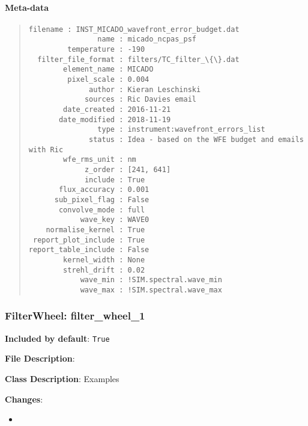 \begin{figure}[H]
\noindent{}\label{fig-micado-ncpas-psf}
\end{figure}


\paragraph{Meta-data%
  \label{id2}%
}

\begin{quote}
\begin{alltt}
\begin{lstlisting}[frame=single]
            filename : INST_MICADO_wavefront_error_budget.dat
                name : micado_ncpas_psf
         temperature : -190
  filter_file_format : filters/TC_filter_\{\}.dat
        element_name : MICADO
         pixel_scale : 0.004
              author : Kieran Leschinski
             sources : Ric Davies email
        date_created : 2016-11-21
       date_modified : 2018-11-19
                type : instrument:wavefront_errors_list
              status : Idea - based on the WFE budget and emails with Ric
        wfe_rms_unit : nm
             z_order : [241, 641]
             include : True
       flux_accuracy : 0.001
      sub_pixel_flag : False
       convolve_mode : full
            wave_key : WAVE0
    normalise_kernel : True
 report_plot_include : True
report_table_include : False
        kernel_width : None
        strehl_drift : 0.02
            wave_min : !SIM.spectral.wave_min
            wave_max : !SIM.spectral.wave_max
\end{lstlisting}
\end{alltt}
\end{quote}


\subsubsection{FilterWheel: \textquotedbl{}filter\_wheel\_1\textquotedbl{}%
  \label{filterwheel-filter-wheel-1}%
}

\textbf{Included by default}: \texttt{True}

\textbf{File Description}:

\textbf{Class Description}: Examples

\textbf{Changes}:

\begin{itemize}
\item \end{itemize}



